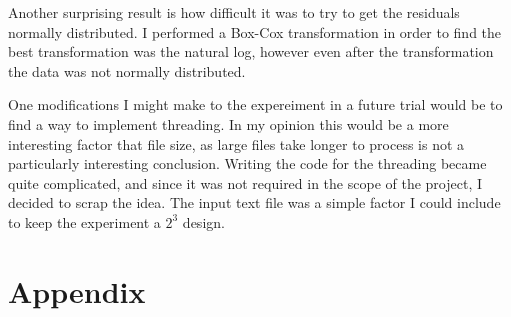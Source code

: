 \documentclass{article}
\begin{document}
Another surprising result is how difficult it was to try to get the residuals normally distributed. I performed a Box-Cox transformation in order to find the best transformation was the natural log, however even after the transformation the data was not normally distributed.

One modifications I might make to the expereiment in a future trial would be to find a way to implement threading. In my opinion this would be a more interesting factor that file size, as large files take longer to process is not a particularly interesting conclusion. Writing the code for the threading became quite complicated, and since it was not required in the scope of the project, I decided to scrap the idea. The input text file was a simple factor I could include to keep the experiment a $2^3$ design.

\clearpage
\appendix
\section{Appendix}
\end{document}
